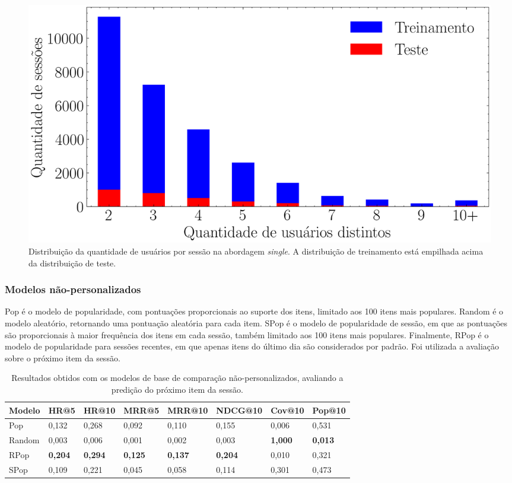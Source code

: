   \begin{figure}[ht]
    \centering
    \includegraphics[width=1\textwidth]{chapters/chap04/images/histograma.png}
    \caption{Distribuição da quantidade de usuários por sessão na abordagem
    \textit{single}. A distribuição de treinamento está empilhada acima da
    distribuição de teste.}
    \label{fig:next-item-single}
  \end{figure}
 

  \subsubsection{Modelos não-personalizados}

  Pop é o modelo de popularidade, com pontuações proporcionais ao suporte dos
  itens, limitado aos 100 itens mais populares. Random é o modelo aleatório,
  retornando uma pontuação aleatória para cada item. SPop é o modelo de
  popularidade de sessão, em que as pontuações são proporcionais à maior
  frequência dos itens em cada sessão, também limitado aos 100 itens mais
  populares. Finalmente, RPop é o modelo de popularidade para sessões recentes,
  em que apenas itens do último dia são considerados por padrão. Foi utilizada a
  avaliação sobre o próximo item da sessão.
\begin{table}[htbp]
  \centering
  \begin{tabular}
    {|l|l|l|l|l|l|l|l|}
    \hline
    Modelo & HR@5 & HR@10 & MRR@5 & MRR@10 & NDCG@10 & Cov@10 & Pop@10 \\ \hline
    Pop & 0,132 & 0,268 & 0,092 & 0,110 & 0,155 & 0,006 & 0,531 \\ \hline
    Random & 0,003 & 0,006 & 0,001 & 0,002 & 0,003 & \textbf{1,000} & \textbf{0,013} \\ \hline
    RPop & \textbf{0,204} & \textbf{0,294} & \textbf{0,125} & \textbf{0,137} & \textbf{0,204} & 0,010 & 0,321 \\ \hline
    SPop & 0,109 & 0,221 & 0,045 & 0,058 & 0,114 & 0,301 & 0,473 \\ \hline
  \end{tabular}
  \caption{Resultados obtidos com os modelos de base de comparação não-personalizados, avaliando a predição do próximo item da sessão.}
\end{table}

